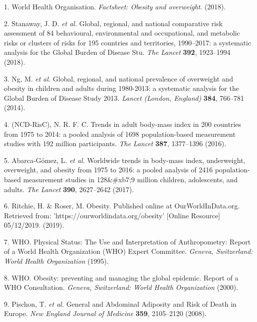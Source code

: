 \documentclass[11pt,twoside]{bristolthesis}
\begin{document}

\noindent

\hypertarget{refs}{}
\leavevmode\hypertarget{ref-WorldHealthOrganisation2018}{}%
1. World Health Organisation. \emph{Factsheet: Obesity and overweight}. (2018).

\leavevmode\hypertarget{ref-Stanaway2018}{}%
2. Stanaway, J. D. \emph{et al.} Global, regional, and national comparative risk assessment of 84 behavioural, environmental and occupational, and metabolic risks or clusters of risks for 195 countries and territories, 1990--2017: a systematic analysis for the Global Burden of Disease Stu. \emph{The Lancet} \textbf{392}, 1923--1994 (2018).

\leavevmode\hypertarget{ref-Ng2014}{}%
3. Ng, M. \emph{et al.} Global, regional, and national prevalence of overweight and obesity in children and adults during 1980-2013: a systematic analysis for the Global Burden of Disease Study 2013. \emph{Lancet (London, England)} \textbf{384}, 766--781 (2014).

\leavevmode\hypertarget{ref-NCD-RisC2016}{}%
4. (NCD-RisC), N. R. F. C. Trends in adult body-mass index in 200 countries from 1975 to 2014: a pooled analysis of 1698 population-based measurement studies with 192 million participants. \emph{The Lancet} \textbf{387}, 1377--1396 (2016).

\leavevmode\hypertarget{ref-Abarca-Gomez2017}{}%
5. Abarca-Gómez, L. \emph{et al.} Worldwide trends in body-mass index, underweight, overweight, and obesity from 1975 to 2016: a pooled analysis of 2416 population-based measurement studies in 128\&\#xb7;9 million children, adolescents, and adults. \emph{The Lancet} \textbf{390}, 2627--2642 (2017).

\leavevmode\hypertarget{ref-Ritchie2019}{}%
6. Ritchie, H. \& Roser, M. Obesity. Published online at OurWorldInData.org. Retrieved from: 'https://ourworldindata.org/obesity' {[}Online Resource{]} 05/12/2019. (2019).

\leavevmode\hypertarget{ref-WHO1995}{}%
7. WHO. Physical Status: The Use and Interpretation of Anthropometry: Report of a World Health Organization (WHO) Expert Committee. \emph{Geneva, Switzerland: World Health Organization} (1995).

\leavevmode\hypertarget{ref-WHO2000}{}%
8. WHO. Obesity: preventing and managing the global epidemic. Report of a WHO Consultation. \emph{Geneva, Switzerland: World Health Organization} (2000).

\leavevmode\hypertarget{ref-Pischon2008}{}%
9. Pischon, T. \emph{et al.} General and Abdominal Adiposity and Risk of Death in Europe. \emph{New England Journal of Medicine} \textbf{359}, 2105--2120 (2008).
\end{document}
